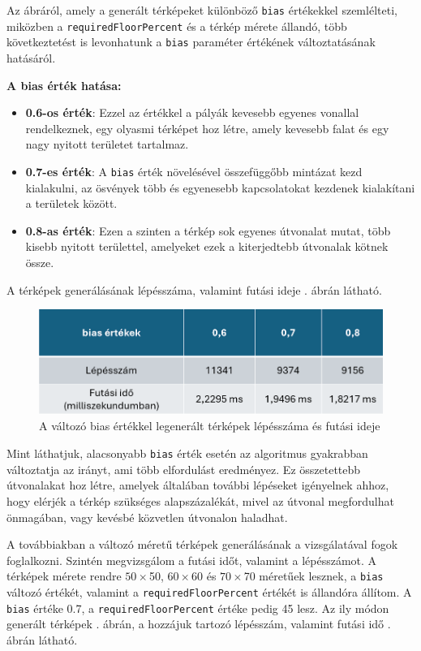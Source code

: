 \newpage
Az ábráról, amely a generált térképeket különböző \texttt{bias} értékekkel szemlélteti, miközben a \texttt{requiredFloorPercent} és a térkép mérete állandó, több következtetést is levonhatunk a \texttt{bias} paraméter értékének változtatásának hatásáról.

\textbf{A bias érték hatása:}
\begin{itemize}
\item \textbf{0.6-os érték}: Ezzel az értékkel a pályák kevesebb egyenes vonallal rendelkeznek, egy olyasmi térképet hoz létre, amely kevesebb falat és egy nagy nyitott területet tartalmaz.
\item \textbf{0.7-es érték}: A \texttt{bias} érték növelésével összefüggőbb mintázat kezd kialakulni, az ösvények több és egyenesebb kapcsolatokat kezdenek kialakítani a területek között.
\item \textbf{0.8-as érték}: Ezen a szinten a térkép sok egyenes útvonalat mutat, több kisebb nyitott területtel, amelyeket ezek a kiterjedtebb útvonalak kötnek össze.
\end{itemize}

A térképek generálásának lépésszáma, valamint futási ideje . ábrán látható.

\begin{figure}[ht]
\centering
\includegraphics[width=\textwidth]{images/fixedpercentruntimestepcount.png}
\caption{A változó bias értékkel legenerált térképek lépésszáma és futási ideje}
\label{fig:fixedpercentruntimestepcount}
\end{figure}

Mint láthatjuk, alacsonyabb \texttt{bias} érték esetén az algoritmus gyakrabban változtatja az irányt, ami több elfordulást eredményez. Ez összetettebb útvonalakat hoz létre, amelyek általában további lépéseket igényelnek ahhoz, hogy elérjék a térkép szükséges alapszázalékát, mivel az útvonal megfordulhat önmagában, vagy kevésbé közvetlen útvonalon haladhat.

A továbbiakban a változó méretű térképek generálásának a vizsgálatával fogok foglalkozni. Szintén megvizsgálom a futási időt, valamint a lépésszámot. A térképek mérete rendre $50 \times $50, $60 \times $60 és $70 \times $70 méretűek lesznek, a \texttt{bias} változó értékét, valamint a \texttt{requiredFloorPercent} értékét is állandóra állítom. A \texttt{bias} értéke 0.7, a \texttt{requiredFloorPercent} értéke pedig 45 lesz. Az ily módon generált térképek . ábrán, a hozzájuk tartozó lépésszám, valamint futási idő . ábrán látható.


